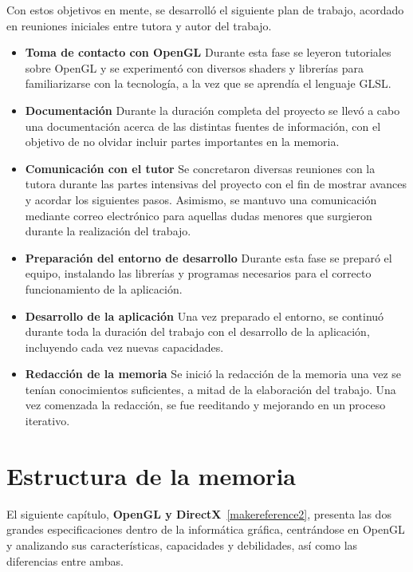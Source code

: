 Con estos objetivos en mente, se desarrolló el siguiente plan de trabajo,
acordado en reuniones iniciales entre tutora y autor del trabajo.

\begin{itemize}
		\item \textbf{Toma de contacto con OpenGL} Durante esta fase se leyeron
				tutoriales sobre OpenGL y se experimentó con diversos shaders y
				librerías para familiarizarse con la tecnología, a la vez que se
				aprendía el lenguaje GLSL.
		\item \textbf{Documentación} Durante la duración completa del proyecto
				se llevó a cabo una documentación acerca de las distintas
				fuentes de información, con el objetivo de no olvidar incluir
				partes importantes en la memoria.
		\item \textbf{Comunicación con el tutor} Se concretaron diversas
				reuniones con la tutora durante las partes intensivas del
				proyecto con el fin de mostrar avances y acordar los siguientes
				pasos. Asimismo, se mantuvo una comunicación mediante correo
				electrónico para aquellas dudas menores que surgieron durante la
				realización del trabajo.
		\item \textbf{Preparación del entorno de desarrollo} Durante esta fase
				se preparó el equipo, instalando las librerías y programas
				necesarios para el correcto funcionamiento de la aplicación.
		\item \textbf{Desarrollo de la aplicación} Una vez preparado el entorno,
				se continuó durante toda la duración del trabajo con el
				desarrollo de la aplicación, incluyendo cada vez nuevas
				capacidades.
		\item \textbf{Redacción de la memoria} Se inició la redacción de la
				memoria una vez se tenían conocimientos suficientes, a mitad de
				la elaboración del trabajo. Una vez comenzada la redacción, se
				fue reeditando y mejorando en un proceso iterativo.
\end{itemize}

\section{Estructura de la memoria}
\label{makereference1.4}

El siguiente capítulo, \textbf{OpenGL y DirectX}~\ref{makereference2}, presenta
las dos grandes especificaciones dentro de la informática gráfica, centrándose
en OpenGL y analizando sus características, capacidades y debilidades, así como
las diferencias entre ambas.

